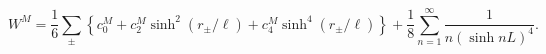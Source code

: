 \begin{equation}
W^M=\frac16\sum_{\pm}\left\{
c^M_0+c^M_2\sinh^2(r_\pm/\ell)+c^M_4\sinh^4(r_\pm/\ell)\right\}
+\frac{1}{8}\sum^\infty_{n=1}\frac{1}{n(\sinh nL)^4}.
\label{wm}
\end{equation}

